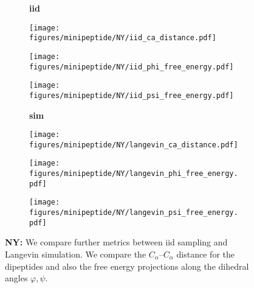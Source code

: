 \begin{figure}
    \centering
    \begin{minipage}{\textwidth}
        \centering
        \begin{subfigure}[c]{0.08\textwidth}
            \textbf{iid}
        \end{subfigure}
        \begin{subfigure}[c]{0.2\textwidth}
            \centering
            \texttt{[image: figures/minipeptide/NY/iid\_ca\_distance.pdf]}            
        \end{subfigure}
        \hspace{0.5cm}
        \begin{subfigure}[c]{0.2\textwidth}
            \centering
            \texttt{[image: figures/minipeptide/NY/iid\_phi\_free\_energy.pdf]}
        \end{subfigure}
        \hspace{0.5cm}
        \begin{subfigure}[c]{0.2\textwidth}
            \centering
            \texttt{[image: figures/minipeptide/NY/iid\_psi\_free\_energy.pdf]}
        \end{subfigure}
    \end{minipage}
    \vspace{0.5cm}
    \begin{minipage}{\textwidth}
        \centering
        \begin{subfigure}[c]{0.08\textwidth}
            \vspace{-0.5cm}
            \textbf{sim}
        \end{subfigure}
        \begin{subfigure}[c]{0.2\textwidth}
            \centering
            \texttt{[image: figures/minipeptide/NY/langevin\_ca\_distance.pdf]}
        \end{subfigure}
        \hspace{0.5cm}
        \begin{subfigure}[c]{0.2\textwidth}
            \centering
            \texttt{[image: figures/minipeptide/NY/langevin\_phi\_free\_energy.pdf]}
        \end{subfigure}
        \hspace{0.5cm}
        \begin{subfigure}[c]{0.2\textwidth}
            \centering
            \texttt{[image: figures/minipeptide/NY/langevin\_psi\_free\_energy.pdf]}
        \end{subfigure}
    \end{minipage}
    \caption{\textbf{NY:} We compare further metrics between iid sampling and Langevin simulation. We compare the $C_\alpha$--$C_\alpha$ distance for the dipeptides and also the free energy projections along the dihedral angles $\varphi, \psi$.}
    \label{fig:minipeptide-ny-more-metrics}
\end{figure}

